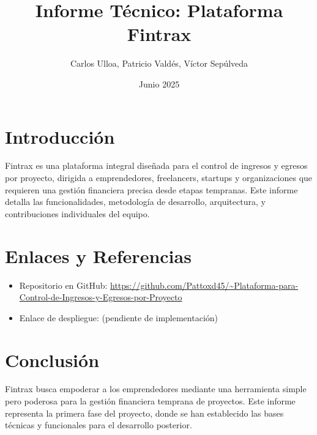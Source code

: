 \documentclass[12pt, a4paper]{article}
\title{Informe Técnico: Plataforma Fintrax}
\author{Carlos Ulloa, Patricio Valdés, Víctor Sepúlveda}
\date{Junio 2025}
\begin{document}
\maketitle
\newpage
\section{Introducción}
Fintrax es una plataforma integral diseñada para el control de ingresos y egresos por proyecto, dirigida a emprendedores, freelancers, startups y organizaciones que requieren una gestión financiera precisa desde etapas tempranas. Este informe detalla las funcionalidades, metodología de desarrollo, arquitectura, y contribuciones individuales del equipo.
\newpage
% 
% 
% 
\section{Enlaces y Referencias}
\begin{itemize}
    \item Repositorio en GitHub: \url{https://github.com/Pattoxd45/~Plataforma-para-Control-de-Ingresos-y-Egresos-por-Proyecto}
    \item Enlace de despliegue: (pendiente de implementación)
\end{itemize}

\section{Conclusión}
Fintrax busca empoderar a los emprendedores mediante una herramienta simple pero poderosa para la gestión financiera temprana de proyectos. Este informe representa la primera fase del proyecto, donde se han establecido las bases técnicas y funcionales para el desarrollo posterior.
\end{document}
